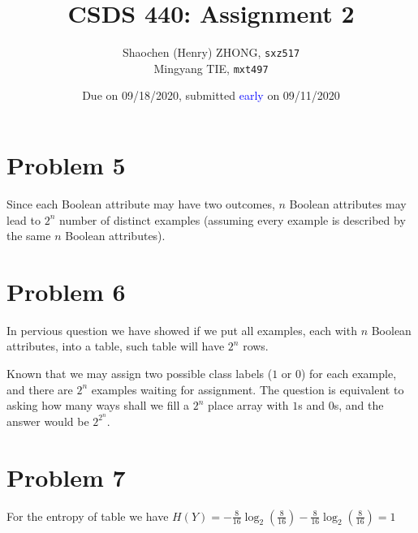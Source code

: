 \documentclass[12pt]{article}
\newcommand{\ilcode}{\texttt}
\begin{document}
\title{\textbf{CSDS 440: Assignment 2}}

\author{Shaochen (Henry) ZHONG, \ilcode{sxz517} \\ Mingyang TIE, \ilcode{mxt497}}
\date{Due on 09/18/2020, submitted \textcolor{blue}{early} on 09/11/2020}
\maketitle


\section{Problem 5}

Since each Boolean attribute may have two outcomes, $n$ Boolean attributes may lead to $2^n$ number of distinct examples (assuming every example is described by the same $n$ Boolean attributes).

\section{Problem 6}

In pervious question we have showed if we put all examples, each with $n$ Boolean attributes, into a table, such table will have $2^n$ rows.

Known that we may assign two possible class labels ($1$ or $0$) for each example, and there are $2^n$ examples waiting for assignment. The question is equivalent to asking how many ways shall we fill a $2^n$ place array with $1$s and $0$s, and the answer would be $2^{2^n}$.

\section{Problem 7}

For the entropy of table we have $H(Y) = -\frac{8}{16} \log_2( \frac{8}{16}) -\frac{8}{16} \log_2( \frac{8}{16}) = 1$
\end{document}
